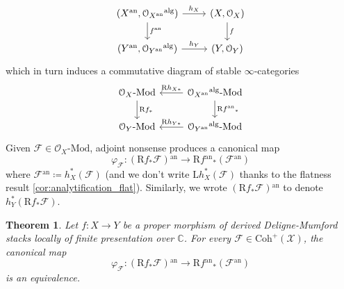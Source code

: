 \documentclass[12pt,a4paper,reqno]{amsart}
\theoremstyle{plain}
\newtheorem{thm}{Theorem}[section]
\theoremstyle{definition}
\theoremstyle{remark}
\numberwithin{equation}{section}
\begin{document}
\[ \begin{tikzcd}
(X{^\mathrm{an}}, {\mathcal O}_{X{^\mathrm{an}}}{^\mathrm{alg}}) \arrow{r}{h_X} \arrow{d}{f{^\mathrm{an}}} & (X, {\mathcal O}_X) \arrow{d}{f} \\
(Y{^\mathrm{an}}, {\mathcal O}_{Y{^\mathrm{an}}}{^\mathrm{alg}}) \arrow{r}{h_Y} & (Y, {\mathcal O}_Y)
\end{tikzcd} \]
which in turn induces a commutative diagram of stable $\infty$-categories
\[ \begin{tikzcd}
{\mathcal O}_X \textrm{-} {\mathrm{Mod}} \arrow{d}{{\mathrm R} f_*} & {\mathcal O}_{X{^\mathrm{an}}}{^\mathrm{alg}} \textrm{-} {\mathrm{Mod}} \arrow{d}{{\mathrm R} f{^\mathrm{an}}_*} \arrow{l}[swap]{{\mathrm R} h_{X*}} \\
{\mathcal O}_Y \textrm{-} {\mathrm{Mod}} & {\mathcal O}_{Y{^\mathrm{an}}}{^\mathrm{alg}} \textrm{-} {\mathrm{Mod}} \arrow{l}[swap]{{\mathrm R} h_{Y*}}
\end{tikzcd} \]
Given ${\mathcal F} \in {\mathcal O}_X \textrm{-} {\mathrm{Mod}}$, adjoint nonsense produces a canonical map
\[ \varphi_{\mathcal F} \colon ({\mathrm R} f_* {\mathcal F}){^\mathrm{an}} \to {\mathrm R} f{^\mathrm{an}}_*({\mathcal F}{^\mathrm{an}}) \]
where ${\mathcal F}{^\mathrm{an}} \coloneqq h_X^*({\mathcal F})$ (and we don't write ${\mathrm L} h_X^*({\mathcal F})$ thanks to the flatness result \cref{cor:analytification_flat}).
Similarly, we wrote $({\mathrm R} f_* {\mathcal F}){^\mathrm{an}}$ to denote $h_Y^*({\mathrm R} f_* {\mathcal F})$.

\begin{thm} \label{thm:derived_GAGA_1}
	Let $f \colon X \to Y$ be a proper morphism of derived {Deligne-Mumford\xspace} stacks locally of finite presentation over $\mathbb C$.
	For every ${\mathcal F} \in {\mathrm{Coh}}^+({\mathcal X})$, the canonical map
	\[ \varphi_{\mathcal F} \colon ({\mathrm R} f_* {\mathcal F}){^\mathrm{an}} \to {\mathrm R} f{^\mathrm{an}}_*({\mathcal F}{^\mathrm{an}}) \]
	is an equivalence.
\end{thm}
\end{document}
